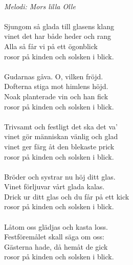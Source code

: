 \\
{\footnotesize\textit{Melodi: Mors lilla Olle}}\\
\\
Sjungom så glada till glasens klang\\
vinet det har både heder och rang\\
Alla så får vi på ett ögonblick\\
rosor på kinden och solsken i blick.\\
\\
Gudarnas gåva. O, vilken fröjd.\\
Dofterna stiga mot himlens höjd.\\
Noak planterade vin och han fick\\
rosor på kinden och solsken i blick.\\
\\
Trivsamt och festligt det ska det va'\\
vinet gör människan vänlig och glad\\
vinet ger färg åt den blekaste prick\\
rosor på kinden och solsken i blick.\\
\\
Bröder och systrar nu höj ditt glas.\\
Vinet förljuvar vårt glada kalas.\\
Drick ur ditt glas och du får på ett kick\\
rosor på kinden och solsken i blick.\\
\\
Låtom oss glädjas och kasta loss.\\
Festföremålet skall säga om oss:\\
Gästerna hade, då hemåt de gick\\
rosor på kinden och solsken i blick.
